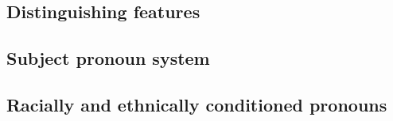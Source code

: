     \subsection{Distinguishing features}
    \subsection{Subject pronoun system}
    \subsection{Racially and ethnically conditioned pronouns} %
